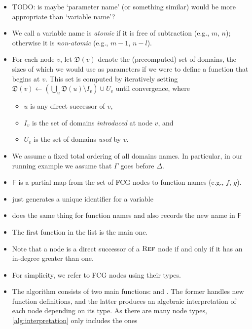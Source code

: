 \documentclass{article}
\theoremstyle{definition}
\DeclareMathOperator{\Reff}{\textsc{Ref}}
\begin{document}
\begin{itemize}
  \item TODO: is maybe `parameter name' (or something similar) would be more
        appropriate than `variable name'?
  \item We call a variable name is \emph{atomic} if it is free of subtraction
        (e.g., $m$, $n$); otherwise it is \emph{non-atomic} (e.g., $m-1$,
        $n-l$).
  \item For each node $v$, let $\mathfrak{D}(v)$ denote the (precomputed) set of
        domains, the sizes of which we would use as parameters if we were to
        define a function that begins at $v$. This set is computed by
        iteratively setting
        $\mathfrak{D}(v) \gets \left(\bigcup_{u} \mathfrak{D}(u) \setminus I_{v}\right) \cup U_{v}$
        until convergence, where
        \begin{itemize}
          \item $u$ is any direct successor of $v$,
          \item $I_{v}$ is the set of domains \emph{introduced} at node $v$, and
          \item $U_{v}$ is the set of domains \emph{used} by $v$.
        \end{itemize}
  \item We assume a fixed total ordering of all domains names. In particular, in
        our running example we assume that $\Gamma$ goes before $\Delta$.
  \item $\mathsf{F}$ is a partial map from the set of FCG nodes to function
        names (e.g., $f$, $g$).
  \item \newVariableName just generates a unique identifier for a variable
  \item \newFunctionName does the same thing for function names and also records
        the new name in $\mathsf{F}$
  \item The first function in the list is the main one.
  \item Note that a node is a direct successor of a $\Reff$ node if and only if
        it has an in-degree greater than one.
  \item For simplicity, we refer to FCG nodes using their types.
  \item The algorithm consists of two main functions: \visit and \actuallyVisit.
        The former handles new function definitions, and the latter produces an
        algebraic interpretation of each node depending on its type. As there
        are many node types, \cref{alg:interpretation} only includes the ones

\end{itemize}
\end{document}
